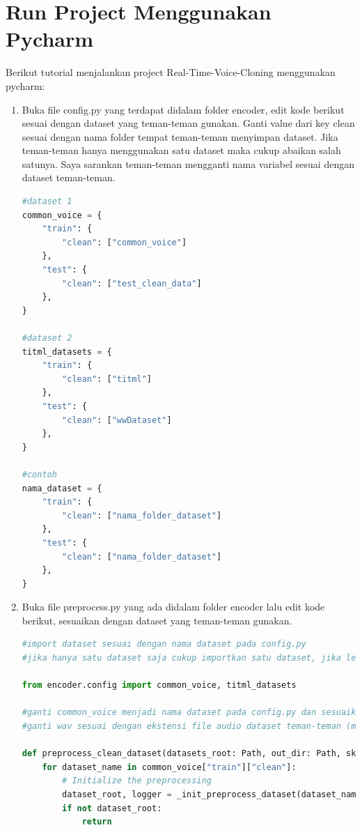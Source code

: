 \section{Run Project Menggunakan Pycharm}
Berikut tutorial menjalankan project Real-Time-Voice-Cloning menggunakan pycharm:
\begin{enumerate}
\item Buka file config.py yang terdapat didalam folder encoder, edit kode berikut sesuai dengan dataset yang teman-teman gunakan. Ganti value dari key clean sesuai dengan nama folder tempat teman-teman menyimpan dataset. Jika teman-teman hanya menggunakan satu dataset maka cukup abaikan salah satunya. Saya sarankan teman-teman mengganti nama variabel sesuai dengan dataset teman-teman.

\begin{lstlisting}[language=Python, caption=Config Dataset (Pycharm)]
#dataset 1
common_voice = {
    "train": {
        "clean": ["common_voice"]
    },
    "test": {
        "clean": ["test_clean_data"]
    },
}

#dataset 2
titml_datasets = {
    "train": {
        "clean": ["titml"]
    },
    "test": {
        "clean": ["wwDataset"]
    },
}

#contoh
nama_dataset = {
    "train": {
        "clean": ["nama_folder_dataset"]
    },
    "test": {
        "clean": ["nama_folder_dataset"]
    },
}
\end{lstlisting}

\item Buka file preprocess.py yang ada didalam folder encoder lalu edit kode berikut, sesuaikan dengan dataset yang teman-teman gunakan.
\begin{lstlisting}[language=Python, caption=Preprocessing Function (Pycharm)]
#import dataset sesuai dengan nama dataset pada config.py
#jika hanya satu dataset saja cukup importkan satu dataset, jika lebih dari dua maka importkan dan pisahkan dengan koma

from encoder.config import common_voice, titml_datasets

#ganti common_voice menjadi nama dataset pada config.py dan sesuaikan dengan yang diimportkan
#ganti wav sesuai dengan ekstensi file audio dataset teman-teman (mp3, flac, wav, m4a)

def preprocess_clean_dataset(datasets_root: Path, out_dir: Path, skip_existing=False):
    for dataset_name in common_voice["train"]["clean"]:
        # Initialize the preprocessing
        dataset_root, logger = _init_preprocess_dataset(dataset_name, datasets_root, out_dir)
        if not dataset_root:
            return


\end{lstlisting}
\end{enumerate}
